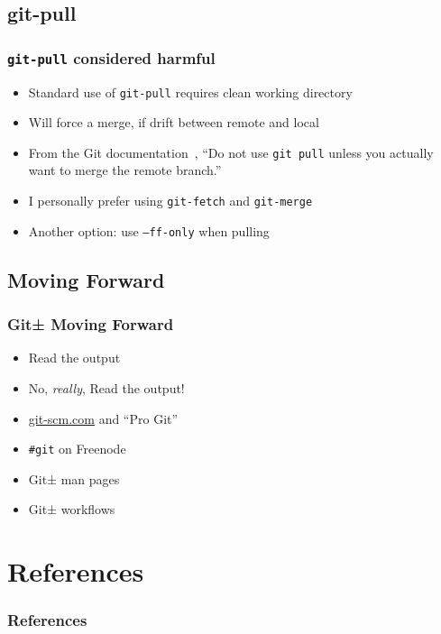 \documentclass{beamer}
\begin{document}
\subsection{git-pull}
\begin{frame}[fragile]
\frametitle{\texttt{git-pull} considered harmful}
\begin{itemize}
\item{Standard use of \texttt{git-pull} requires clean working directory}
\item{Will force a merge, if drift between remote and local}
\item{From the Git documentation~\cite{website:gitworkflows7}, ``Do not use
\texttt{git pull} unless you actually want to merge the remote branch.''}
\item{I personally prefer using \texttt{git-fetch} and \texttt{git-merge}}
\item{Another option: use \texttt{--ff-only} when pulling}
\end{itemize}

\end{frame}

\subsection{Moving Forward}
\begin{frame}
\frametitle{Git± Moving Forward}
\begin{itemize}
\item<2->{Read the output}
\item<3->{No, \textit{really}, Read the output!}
\item<4->{\url{git-scm.com} and ``Pro Git''}
\item<5->{\texttt{\#{}git} on Freenode}
\item<6->{Git± man pages~\cite{website:git_man_pages}}
\item<7->{Git± workflows~\cite{website:gitworkflows7}}
\end{itemize}
\end{frame}

\section*{References}
\begin{frame}[allowframebreaks]
\frametitle{References}
\nocite{*}
\renewcommand{\refname}{}


\end{frame}

\end{document}
